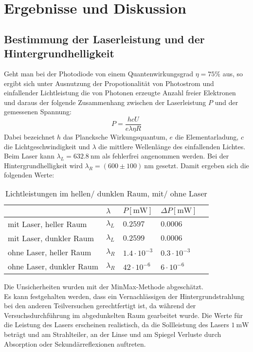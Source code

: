 \documentclass[11pt,a4paper,oneside]{scrartcl}
\begin{document}
\section{Ergebnisse und Diskussion}
\subsection{Bestimmung der Laserleistung und der Hintergrundhelligkeit}

Geht man bei der Photodiode von einem Quantenwirkungsgrad $\eta=75\%$ aus, so ergibt sich unter Ausnutzung der Propotionalität von Photostrom und einfallender Lichtleistung die von Photonen erzeugte Anzahl freier Elektronen und daraus der folgende Zusammenhang zwischen der Laserleistung $P$ und der gemessenen Spannung:
\begin{equation}\label{P_diode}
P=\frac{hcU}{e\lambda\eta R}
\end{equation}
Dabei bezeichnet $h$ das Plancksche Wirkungsquantum, $e$ die Elementarladung, $c$ die Lichtgeschwindigkeit und $\lambda$ die mittlere Wellenlänge des einfallenden Lichtes. Beim Laser kann $\lambda_L=632.8\ \mathrm{nm}$ als fehlerfrei angenommen werden. Bei der Hintergrundhelligkeit wird $\lambda_R=(600\pm 100)\ \mathrm{nm}$ gesetzt.
Damit ergeben sich die folgenden Werte:\\
\begin{table}[H]
\centering
\begin{tabular}{@{}lllll@{}}
\toprule
                        & $\lambda$   & $P [\mathrm{mW}]$  & $\Delta P[\mathrm{mW}]$ &  \\ \midrule
mit Laser, heller Raum  & $\lambda_L$ & $0.2597$           & $0.0006$                &  \\
mit Laser, dunkler Raum & $\lambda_L$ & $0.2599$           & $0.0006$                &  \\
ohne Laser, heller Raum   & $\lambda_R$ & $1.4\cdot 10^{-3}$ & $0.3\cdot 10^{-3}$      &  \\
ohne Laser, dunkler Raum & $\lambda_R$ & $42\cdot 10^{-6}$  & $6\cdot10^{-6}$         &  \\ \bottomrule
\end{tabular}
\caption{Lichtleistungen im hellen/ dunklen Raum, mit/ ohne Laser}
\end{table}
Die Unsicherheiten wurden mit der MinMax-Methode abgeschätzt.\\
Es kann festgehalten werden, dass ein Vernachlässigen der Hintergrundstrahlung bei den anderen Teilversuchen gerechtfertigt ist, da während der Versuchsdurchführung im abgedunkelten Raum gearbeitet wurde. Die Werte für die Leistung des Lasers erscheinen realistisch, da die Sollleistung des Lasers $1\ \mathrm{mW}$ beträgt und am Strahlteiler, an der Linse und am Spiegel Verluste durch Absorption oder Sekundärreflexionen auftreten.\\
\end{document}
